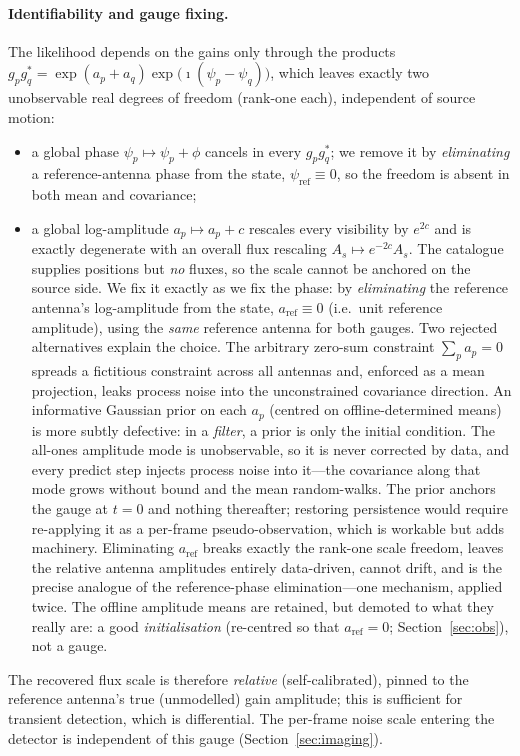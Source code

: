 \documentclass[11pt]{article}
\begin{document}
\paragraph{Identifiability and gauge fixing.} The likelihood depends on the gains only through
the products $g_p g_q^{\ast}=\exp(a_p+a_q)\exp\!\big(\imath(\psi_p-\psi_q)\big)$, which leaves
exactly two unobservable real degrees of freedom (rank-one each), independent of source motion:
\begin{itemize}[leftmargin=*]
  \item a global phase $\psi_p\mapsto\psi_p+\phi$ cancels in every $g_pg_q^{\ast}$; we remove
        it by \emph{eliminating} a reference-antenna phase from the state,
        $\psi_{\mathrm{ref}}\equiv0$, so the freedom is absent in both mean and covariance;
  \item a global log-amplitude $a_p\mapsto a_p+c$ rescales every visibility by $e^{2c}$ and is
        exactly degenerate with an overall flux rescaling $A_s\mapsto e^{-2c}A_s$. The
        catalogue supplies positions but \emph{no} fluxes, so the scale cannot be anchored on
        the source side. We fix it exactly as we fix the phase: by \emph{eliminating} the
        reference antenna's log-amplitude from the state, $a_{\mathrm{ref}}\equiv0$ (i.e.\ unit
        reference amplitude), using the \emph{same} reference antenna for both gauges. Two
        rejected alternatives explain the choice. The arbitrary zero-sum constraint
        $\sum_p a_p=0$ spreads a fictitious constraint across all antennas and, enforced as a
        mean projection, leaks process noise into the unconstrained covariance direction. An
        informative Gaussian prior on each $a_p$ (centred on offline-determined means) is more
        subtly defective: in a \emph{filter}, a prior is only the initial condition. The
        all-ones amplitude mode is unobservable, so it is never corrected by data, and every
        predict step injects process noise into it---the covariance along that mode grows
        without bound and the mean random-walks. The prior anchors the gauge at $t=0$ and
        nothing thereafter; restoring persistence would require re-applying it as a per-frame
        pseudo-observation, which is workable but adds machinery. Eliminating
        $a_{\mathrm{ref}}$ breaks exactly the rank-one scale freedom, leaves the relative
        antenna amplitudes entirely data-driven, cannot drift, and is the precise analogue of
        the reference-phase elimination---one mechanism, applied twice. The offline amplitude
        means are retained, but demoted to what they really are: a good \emph{initialisation}
        (re-centred so that $a_{\mathrm{ref}}=0$; Section~\ref{sec:obs}), not a gauge.
\end{itemize}
The recovered flux scale is therefore \emph{relative} (self-calibrated), pinned to the reference
antenna's true (unmodelled) gain amplitude; this is sufficient for transient detection, which is
differential. The per-frame noise scale entering the detector is independent of this gauge
(Section~\ref{sec:imaging}).
\end{document}
